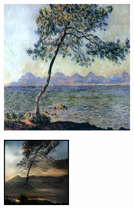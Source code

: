 \documentclass{article}
\begin{document}
\begin{figure}[H]
\begin{subfigure}{.112\textwidth}
    \end{subfigure}\hspace{.010\textwidth}%
    \begin{subfigure}{.112\textwidth}
        \centering
        \includegraphics[width=\linewidth]{00040.jpg}
    \end{subfigure}%
    \begin{subfigure}{.112\textwidth}
        \centering
        \includegraphics[width=\linewidth]{0004.png}
    \end{subfigure}
    

\end{figure}
\end{document}
